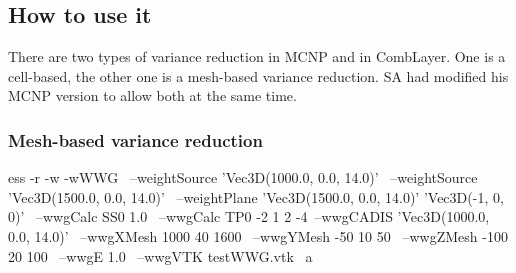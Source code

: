 \subsection{How to use it}
There are two types of variance reduction in MCNP and in CombLayer.
One is a cell-based, the other one is a mesh-based variance reduction.
SA had modified his MCNP version to allow both at the same time.

\subsubsection{Mesh-based variance reduction}
\label{sec:vr:cadis:mesh}
\begin{bash}
ess -r -w -wWWG \ 
 --weightSource 'Vec3D(1000.0, 0.0, 14.0)' \
 --weightSource 'Vec3D(1500.0, 0.0, 14.0)' \
 --weightPlane 'Vec3D(1500.0, 0.0, 14.0)' 'Vec3D(-1, 0, 0)' \
 --wwgCalc SS0 1.0 \
 --wwgCalc TP0 -2 1 2 -4\
 --wwgCADIS 'Vec3D(1000.0, 0.0, 14.0)' \
 --wwgXMesh 1000 40 1600 \
 --wwgYMesh -50 10 50 \
 --wwgZMesh -100 20 100 \
 --wwgE 1.0 \
 --wwgVTK testWWG.vtk \
   a
\end{bash}

